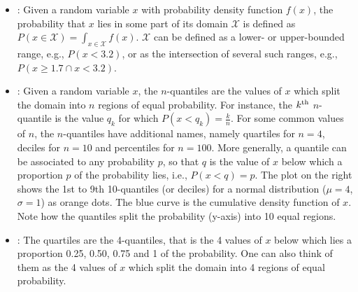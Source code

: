 \documentclass[draftspec]{sbmlpkgspec}
\newcommand{\sbmlthreecore}{SBML Level~3 Core\xspace}
\newcommand{\UncertParameter}{\defRef{UncertParameter}{UncertParameter-class}}
\begin{document}
\begin{itemize}
\item {}:  Given a random variable $ x $ with probability density function $ f(x) $, the probability that $ x $ lies in some part of its domain $ \mathcal{X} $ is defined as $ P(x \in \mathcal{X}) = \int_{x\in\mathcal{X}} f(x) $. $ \mathcal{X} $ can be defined as a lower- or upper-bounded range, e.g., $ P(x < 3.2) $, or as the intersection of several such ranges, e.g., $ P(x \geq 1.7 \cap x < 3.2) $.

\item {}:  Given a random variable $ x $, the $ n $-quantiles are the values of $ x $ which split the domain into $ n $ regions of equal probability. For instance, the $ k\textsuperscript{th} $ $ n $-quantile is the value $ q_k $ for which $ P(x<q_k) = \frac{k}{n} $. For some common values of $ n $, the $ n $-quantiles have additional names, namely quartiles for $ n=4 $, deciles for $ n=10 $ and percentiles for $ n=100 $.
More generally, a quantile can be associated to any probability $ p $, so that $ q $ is the value of $ x $ below which a proportion $ p $ of the probability lies, i.e., $ P(x<q) = p $.
The plot on the right shows the 1st to 9th 10-quantiles (or deciles) for a normal distribution ($ \mu = 4 $, $ \sigma = 1 $) as orange dots. The blue curve is the cumulative density function of $ x $. Note how the quantiles split the probability (y-axis) into 10 equal regions.

\item {}:  The quartiles are the 4-quantiles, that is the 4 values of $ x $ below which lies a proportion 0.25, 0.50, 0.75 and 1 of the probability. One can also think of them as the 4 values of $ x $ which split the domain into 4 regions of equal probability.
\end{itemize}



\end{document}
